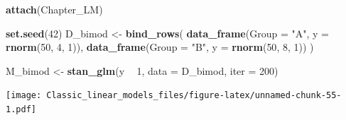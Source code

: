 \documentclass[]{svmono}
\newenvironment{Shaded}{\begin{snugshade}}{\end{snugshade}}
\newcommand{\KeywordTok}[1]{\textcolor[rgb]{0.13,0.29,0.53}{\textbf{#1}}}
\newcommand{\DataTypeTok}[1]{\textcolor[rgb]{0.13,0.29,0.53}{#1}}
\newcommand{\DecValTok}[1]{\textcolor[rgb]{0.00,0.00,0.81}{#1}}
\newcommand{\StringTok}[1]{\textcolor[rgb]{0.31,0.60,0.02}{#1}}
\newcommand{\OperatorTok}[1]{\textcolor[rgb]{0.81,0.36,0.00}{\textbf{#1}}}
\newcommand{\NormalTok}[1]{#1}
\theoremstyle{definition}
\theoremstyle{definition}
\theoremstyle{definition}
\theoremstyle{remark}
\begin{document}
\begin{Shaded}
\begin{Highlighting}[]
\KeywordTok{attach}\NormalTok{(Chapter_LM)}
\end{Highlighting}
\end{Shaded}

\begin{Shaded}
\begin{Highlighting}[]
\KeywordTok{set.seed}\NormalTok{(}\DecValTok{42}\NormalTok{)}
\NormalTok{D_bimod <-}\StringTok{ }
\StringTok{  }\KeywordTok{bind_rows}\NormalTok{(}
    \KeywordTok{data_frame}\NormalTok{(}\DataTypeTok{Group =} \StringTok{"A"}\NormalTok{, }\DataTypeTok{y =} \KeywordTok{rnorm}\NormalTok{(}\DecValTok{50}\NormalTok{, }\DecValTok{4}\NormalTok{, }\DecValTok{1}\NormalTok{)),}
    \KeywordTok{data_frame}\NormalTok{(}\DataTypeTok{Group =} \StringTok{"B"}\NormalTok{, }\DataTypeTok{y =} \KeywordTok{rnorm}\NormalTok{(}\DecValTok{50}\NormalTok{, }\DecValTok{8}\NormalTok{, }\DecValTok{1}\NormalTok{))}
\NormalTok{  )}
\end{Highlighting}
\end{Shaded}

\begin{Shaded}
\begin{Highlighting}[]
\NormalTok{M_bimod <-}\StringTok{ }\KeywordTok{stan_glm}\NormalTok{(y }\OperatorTok{~}\StringTok{ }\DecValTok{1}\NormalTok{, }\DataTypeTok{data =}\NormalTok{ D_bimod, }\DataTypeTok{iter =} \DecValTok{200}\NormalTok{)}
\end{Highlighting}
\end{Shaded}

\begin{Shaded}
\end{Shaded}

\texttt{[image: Classic\_linear\_models\_files/figure-latex/unnamed-chunk-55-1.pdf]}
\end{document}
